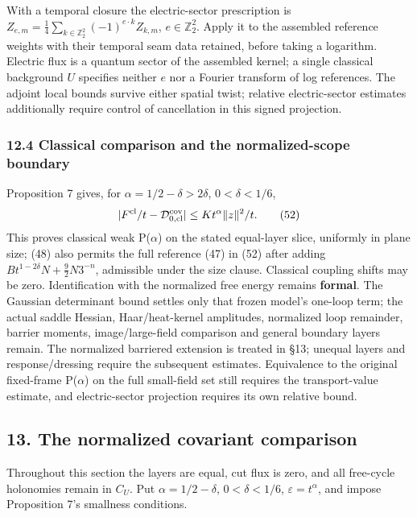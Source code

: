 \documentclass[11pt,a4paper]{article}
\begin{document}
With a temporal closure the electric-sector prescription is
\(Z_{e,m}=\frac14\sum_{k\in\mathbb Z_2^2}(-1)^{e\cdot k}Z_{k,m}\),
\(e\in\mathbb Z_2^2\). Apply it to the assembled reference weights with
their temporal seam data retained, before taking a logarithm. Electric
flux is a quantum sector of the assembled kernel; a single classical
background \(U\) specifies neither \(e\) nor a Fourier transform of log
references. The adjoint local bounds survive either spatial twist;
relative electric-sector estimates additionally require control of
cancellation in this signed projection.

\hypertarget{classical-comparison-and-the-normalized-scope-boundary}{%
\subsubsection{12.4 Classical comparison and the normalized-scope
boundary}\label{classical-comparison-and-the-normalized-scope-boundary}}

Proposition 7 gives, for \(\alpha=1/2-\delta>2\delta\),
\(0<\delta<1/6\), \[|F^{\rm cl}/t-\mathcal D_{0,\rm cl}^{\rm cov}|
\le Kt^\alpha\|z\|^2/t.\tag{52}\] This proves classical weak
P(\(\alpha\)) on the stated equal-layer slice, uniformly in plane size;
(48) also permits the full reference (47) in (52) after adding
\(Bt^{1-2\delta}N+\frac92N3^{-n}\), admissible under the size clause.
Classical coupling shifts may be zero. Identification with the
normalized free energy remains \textbf{formal}. The Gaussian determinant
bound settles only that frozen model's one-loop term; the actual saddle
Hessian, Haar/heat-kernel amplitudes, normalized loop remainder, barrier
moments, image/large-field comparison and general boundary layers
remain. The normalized barriered extension is treated in §13; unequal
layers and response/dressing require the subsequent estimates.
Equivalence to the original fixed-frame P(\(\alpha\)) on the full
small-field set still requires the transport-value estimate, and
electric-sector projection requires its own relative bound.

\hypertarget{the-normalized-covariant-comparison}{%
\subsection{13. The normalized covariant
comparison}\label{the-normalized-covariant-comparison}}

Throughout this section the layers are equal, cut flux is zero, and all
free-cycle holonomies remain in \(C_U\). Put \(\alpha=1/2-\delta\),
\(0<\delta<1/6\), \(\varepsilon=t^\alpha\), and impose Proposition 7's
smallness conditions.
\end{document}
